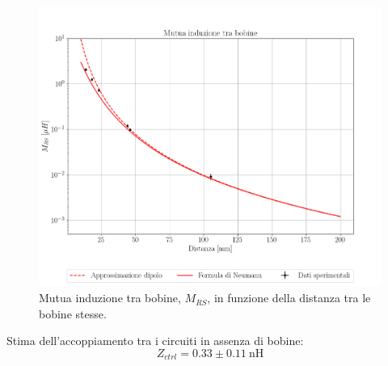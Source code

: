 \documentclass[../../presentazione_orale.tex]{subfiles}
\begin{document}
\begin{figure}[h!]
    \centering
    \includegraphics[scale = 0.55]{Grafici/induttanza2.png}
    \caption{Mutua induzione tra bobine, $M_{RS}$, in funzione della distanza tra le bobine stesse.}
    \label{fig:induzione}
\end{figure}
Stima dell'accoppiamento tra i circuiti in assenza di bobine:
$$ Z_{ctrl} = 0.33\pm0.11~\si{\nano\henry}$$
\end{document}
